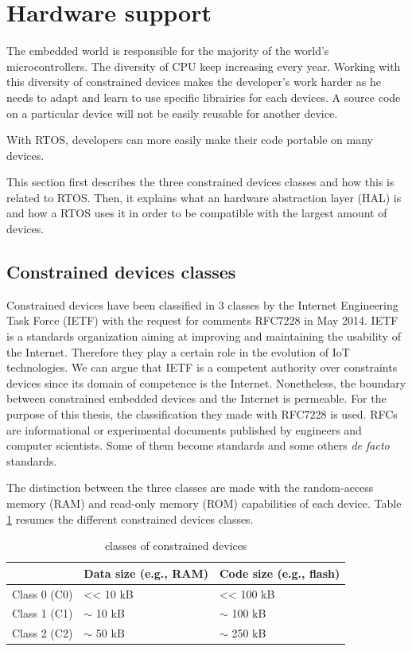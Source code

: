 \section{Hardware support}

The embedded world is responsible for the majority of the world's microcontrollers.
The diversity of CPU keep increasing every year.
Working with this diversity of constrained devices makes the developer's work harder as he needs to adapt and learn to use specific librairies for each devices.
A source code on a particular device will not be easily reusable for another device.

With RTOS, developers can more easily make their code portable on many devices.

This section first describes the three constrained devices classes and how this is related to RTOS.
Then, it explains what an hardware abstraction layer (HAL) is and how a RTOS uses it in order to be compatible with the largest amount of devices.

\subsection{Constrained devices classes}

Constrained devices have been classified in 3 classes by the Internet Engineering Task Force (IETF) with the request for comments RFC7228\cite{RFC7228} in May 2014.
IETF is a standards organization aiming at improving and maintaining the usability of the Internet.
Therefore they play a certain role in the evolution of IoT technologies.
We can argue that IETF is a competent authority over constraints devices since its domain of competence is the Internet.
Nonetheless, the boundary between constrained embedded devices and the Internet is permeable.
For the purpose of this thesis, the classification they made with RFC7228 is used.
RFCs are informational or experimental documents published by engineers and computer scientists.
Some of them become standards and some others \textit{de facto} standards.

The distinction between the three classes are made with the random-access memory (RAM) and read-only memory (ROM) capabilities of each device.
Table \ref{tab:constrained-devices-classes} resumes the different constrained devices classes.

\begin{table}[!h]
  \centering
  \begin{tabular}{|l|l|l|}
  \hline
   & Data size (e.g., RAM) & Code size (e.g., flash) \\ \hline
  Class 0 (C0) & \textless{}\textless{} 10 kB & \textless{}\textless{} 100 kB \\ %
  Class 1 (C1) & $\sim$ 10 kB & $\sim$ 100 kB \\ %
  Class 2 (C2) & $\sim$ 50 kB & $\sim$ 250 kB \\ \hline
  \end{tabular}
  \caption{classes of constrained devices}
  \label{tab:constrained-devices-classes}
\end{table}

